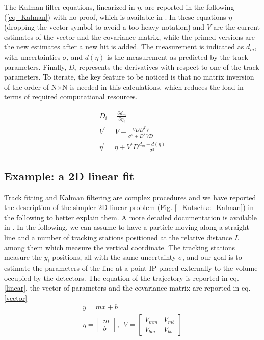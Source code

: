 \documentclass[12pt,a4paper,openright, oneside, titlepage]{book} %
\begin{document}
\noindent
The Kalman filter equations, linearized  in $\eta$, are reported in the following (\ref{eq_Kalman}) with no proof, which is available in \cite{KutschkePaper}. 
In these equations $\eta$ (dropping the vector symbol to avoid a too heavy notation) and $V$ are the current estimates of the vector and the covariance matrix, while the primed versions are the new estimates after a new hit is added. 
The measurement is indicated as $d_m$, with uncertainties $\sigma$, 
and $d(\eta)$ is the measurement as predicted by the track parameters. 
Finally, $D_i$ represents the derivatives with respect to one of the track parameters. 
To iterate, the key feature to be noticed is that no matrix inversion of the order of N$\times$N is needed in this calculations,
which reduces the load in terms of required computational resources.

\begin{equation}
\begin{gathered}
D_i = \frac{\partial d_m}{\partial \eta_i} \\
V^\prime = V - \frac{VDD^TV}{\sigma^2+D^TVD}\\
\eta^\prime = \eta + V^\prime D \frac{d_m-d(\eta)}{\sigma^2}
\end{gathered} 
\label{eq_Kalman}
\end{equation}

\subsection{Example: a 2D linear fit}
\label{2Dfit}
Track fitting and Kalman filtering are complex procedures 
and we have reported the description of the simpler 2D linear problem (Fig. \ref{_Kutschke_Kalman})
in the following to better explain them. A more detailed documentation is available in 
 \cite{Kutschke} \cite{KutschkePaper}. 
In the following, we can assume to have a particle moving along a straight line 
and a number of tracking stations positioned at the relative
distance $L$ among them which measure the vertical coordinate.
The tracking stations measure the $y_i$ positions, 
all with the same uncertainty $\sigma$, 
and our goal is to estimate the parameters of the line at a point IP
placed externally to the volume occupied by the detectors.
The equation of the trajectory is reported in eq. \ref{linear}, 
the vector of parameters and the covariance matrix are reported in eq. \ref{vector}
\begin{gather}
y = mx +b \label{linear}\\
\eta = \begin{bmatrix} m \\  b \end{bmatrix},\ \ V=\begin{bmatrix} V_{mm}& V_{mb} \\ V_{bm}& V_{bb} \end{bmatrix} \label{vector}
\end{gather}  
\end{document}
